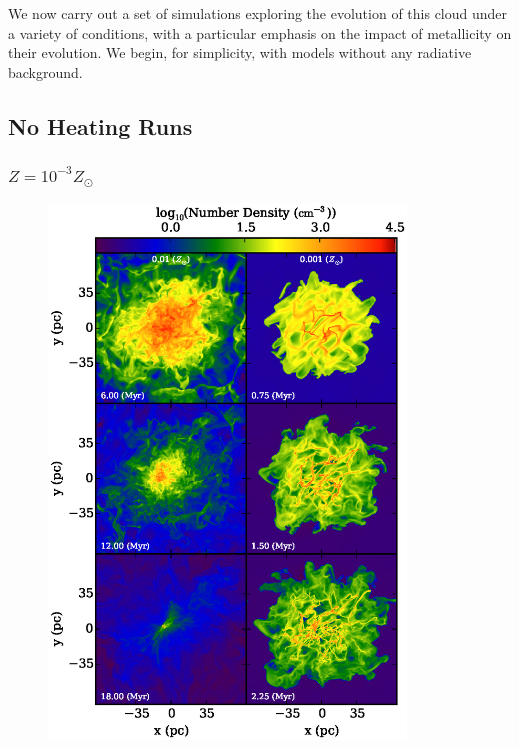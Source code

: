 \documentclass[useAMS,usenatbib]{mn2e}
\begin{document}
We now carry out a set of simulations exploring the evolution of this cloud under a variety of conditions, with a particular emphasis on the impact of metallicity on their evolution.  We begin, for simplicity, with models without any radiative background.


\subsection{No Heating Runs}

\subsubsection{$Z=10^{-3}Z_\odot$}

\begin{figure}
\begin{center}
\hspace{-0.5cm}
\includegraphics[width=9.5cm]{Images/slice_number_density_panel} \hspace{-1.1cm}

\end{center}
\end{figure}
\end{document}
